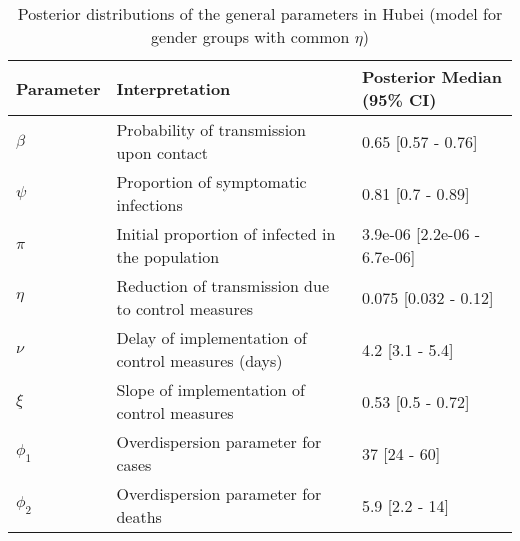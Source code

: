 \begin{table}[ht]
\centering
\begin{tabular}{lp{9cm}p{3cm}}
  \hline
Parameter & Interpretation & Posterior Median (95\% CI) \\ 
  \hline
$\beta$ & Probability of transmission upon contact & 0.65 [0.57 - 0.76] \\ 
  $\psi$ & Proportion of symptomatic infections & 0.81 [0.7 - 0.89] \\ 
  $\pi$ & Initial proportion of infected in the population & 3.9e-06 [2.2e-06 - 6.7e-06] \\ 
  $\eta$ & Reduction of transmission due to control measures & 0.075 [0.032 - 0.12] \\ 
  $\nu$ & Delay of implementation of control measures (days) & 4.2 [3.1 - 5.4] \\ 
  $\xi$ & Slope of implementation of control measures & 0.53 [0.5 - 0.72] \\ 
  $\phi_1$ & Overdispersion parameter for cases & 37 [24 - 60] \\ 
  $\phi_2$ & Overdispersion parameter for deaths & 5.9 [2.2 - 14] \\ 
   \hline
\end{tabular}
\caption{Posterior distributions of the general parameters in Hubei (model for gender groups with common $\eta$)} 
\label{tab:ParamTableHubei_Gender_CommonEta}
\end{table}
